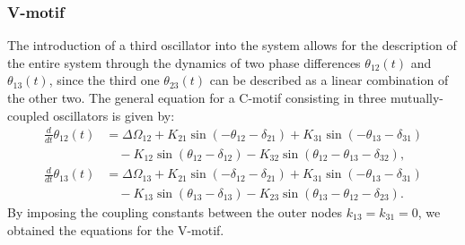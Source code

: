 \documentclass[../main.tex]{subfiles}
\begin{document}
\subsubsection{V-motif}
The introduction of a third oscillator into the system allows for the description of the entire system through the dynamics of two phase differences $\theta_{12}(t)$ and $\theta_{13}(t)$, since the third one $\theta_{23}(t)$ can be described as a linear combination of the other two.
The general equation for a C-motif consisting in three mutually-coupled oscillators is given by:
\begin{equation}
\begin{aligned}
    \displaystyle\frac{d}{dt}\theta_{12}(t) & = \Delta\Omega_{12} + K_{21}\sin(-\theta_{12}-\delta_{21}) + K_{31}\sin(-\theta_{13} - \delta_{31})\\
       & \quad - K_{12}\sin(\theta_{12}-\delta_{12}) - K_{32}\sin(\theta_{12}-\theta_{13}-\delta_{32}), \\
    \displaystyle\frac{d}{dt}\theta_{13}(t) & = \Delta\Omega_{13} + K_{21}\sin(-\delta_{12}-\delta_{21}) + K_{31}\sin(-\theta_{13} - \delta_{31}) \\
    & \quad -K_{13}\sin(\theta_{13}-\delta_{13}) - K_{23}\sin(\theta_{13}-\theta_{12}-\delta_{23}).
    \label{eq:vmotif}
\end{aligned}
\end{equation}
By imposing the coupling constants between the outer nodes $k_{13}=k_{31}=0$, we obtained the equations for the V-motif.
\end{document}
